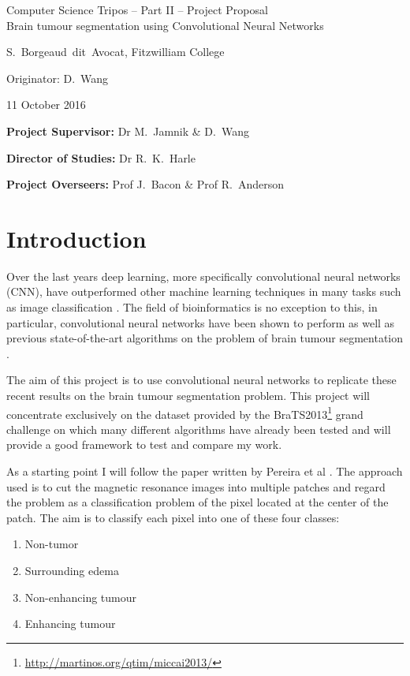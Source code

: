 \documentclass[12pt,a4paper,twoside]{article}
\begin{document}
\begin{center}
\Large
Computer Science Tripos -- Part II -- Project Proposal\\[4mm]
\LARGE
Brain tumour segmentation using Convolutional Neural Networks

\large
S.~Borgeaud~dit~Avocat, Fitzwilliam College

Originator: D.~Wang

11 October 2016
\end{center}

\vspace{5mm}

\textbf{Project Supervisor:} Dr M.~Jamnik \& D.~Wang

\textbf{Director of Studies:} Dr R.~K.~Harle

\textbf{Project Overseers:} Prof J.~Bacon  \& Prof R.~Anderson


\section*{Introduction}

Over the last years deep learning, more specifically convolutional neural networks (CNN), have outperformed other machine learning techniques in many tasks such as image classification \cite{nature-deep-learning-review}. The field of bioinformatics is no exception to this, in particular, convolutional neural networks have been shown to perform as well as previous state-of-the-art algorithms on the problem of brain tumour segmentation \cite{brats-proceedings}.

The aim of this project is to use convolutional neural networks to replicate these recent results on the brain tumour segmentation problem. This project will concentrate exclusively on the dataset provided by the BraTS2013\footnote{\url{http://martinos.org/qtim/miccai2013/}} grand challenge on which many different algorithms have already been tested and will provide a good framework to test and compare my work.

As a starting point I will follow the paper written by Pereira et al \cite{pereira}. The approach used is to cut the magnetic resonance images into multiple patches and regard the problem as a classification problem of the pixel located at the center of the patch. The aim is to classify each pixel into one of these four classes:
\begin{enumerate}
	\item Non-tumor
	\item Surrounding edema
	\item Non-enhancing tumour
	\item Enhancing tumour
\end{enumerate}
\end{document}
